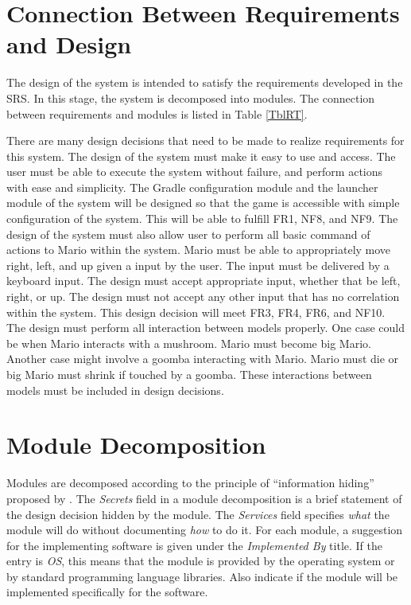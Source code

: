 \documentclass[12pt, titlepage]{article}
\begin{document}
\section{Connection Between Requirements and Design} \label{SecConnection}

The design of the system is intended to satisfy the requirements developed in
the SRS. In this stage, the system is decomposed into modules. The connection
between requirements and modules is listed in Table \ref{TblRT}.

There are many design decisions that need to be made to realize requirements for this system. The design of the system must make it easy to use and access. The user must be able to execute the system without failure, and perform actions with ease and simplicity. The Gradle configuration module and the launcher module of the system will be designed so that the game is accessible with simple configuration of the system. This will be able to fulfill FR1, NF8, and NF9. The design of the system must also allow user to perform all basic command of actions to Mario within the system. Mario must be able to appropriately move right, left, and up given a input by the user. The input must be delivered by a keyboard input. The design must accept appropriate input, whether that be left, right, or up. The design must not accept any other input that has no correlation within the system. This design decision will meet FR3, FR4, FR6, and NF10. The design must perform all interaction between models properly. One case could be when Mario interacts with a mushroom. Mario must become big Mario. Another case might involve a goomba interacting with Mario. Mario must die or big Mario must shrink if touched by a goomba. These interactions between models must be included in design decisions.

\section{Module Decomposition} \label{SecMD}

Modules are decomposed according to the principle of ``information hiding''
proposed by \citet{ParnasEtAl1984}. The \emph{Secrets} field in a module
decomposition is a brief statement of the design decision hidden by the
module. The \emph{Services} field specifies \emph{what} the module will do
without documenting \emph{how} to do it. For each module, a suggestion for the
implementing software is given under the \emph{Implemented By} title. If the
entry is \emph{OS}, this means that the module is provided by the operating
system or by standard programming language libraries.  Also indicate if the
module will be implemented specifically for the software.
\end{document}
